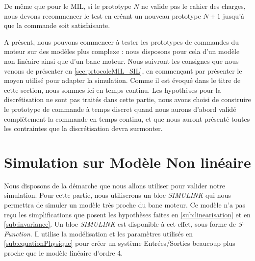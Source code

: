 	De même que pour le MIL, si le prototype $N$ ne valide pas le cahier des charges, nous devons recommencer le test en créant un nouveau prototype $N+1$ jusqu'à que la commande soit satisfaisante. 
	\begin{center}
	A présent, nous pouvons commencer à tester les prototypes de commandes du moteur sur des modèles plus complexe : nous disposons pour cela d'un modèle non linéaire ainsi que d'un banc moteur. Nous suivront les consignes que nous venons de présenter en \ref{sec:prtocoleMIL_SIL}, en commençant par présenter le moyen utilisé pour adapter la simulation. 
	Comme il est évoqué dans le titre de cette section, nous sommes ici en temps continu. Les hypothèses pour la discrétisation ne sont pas traités dans cette partie, nous avons choisi de construire le prototype de commande à temps discret quand nous aurons d'abord validé complètement la commande en temps continu, et que nous auront présenté toutes les contraintes que la discrétisation devra surmonter. 
	\end{center}
	\section{Simulation sur Modèle Non linéaire}
		
		Nous disposons de la démarche que nous allons utiliser pour valider notre simulation. Pour cette partie, nous utiliserons un bloc \emph{SIMULINK} qui nous permettra de simuler un modèle très proche du banc moteur. Ce modèle n'a pas reçu les simplifications que posent les hypothèses faites en \ref{sub:linearisation} et en \ref{sub:invariance}. Un bloc \emph{SIMULINK} est disponible à cet effet, sous forme de \emph{S-Function}. Il utilise la modélisation et les paramètres utilisés en \ref{sub:equationPhysique} pour créer un système Entrées/Sorties beaucoup plus proche que le modèle linéaire d'ordre 4. 
